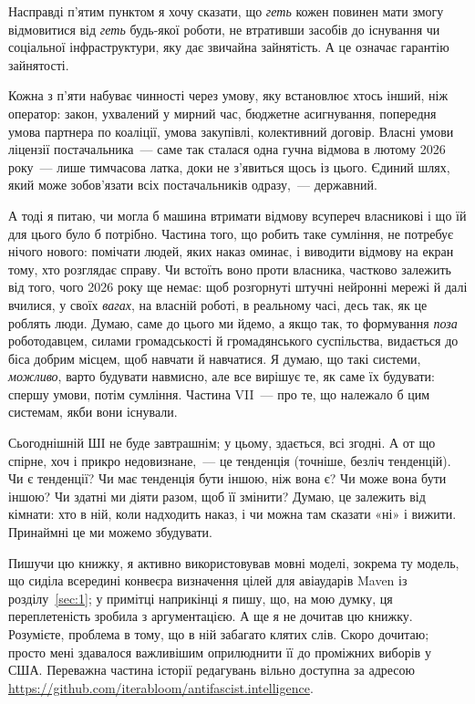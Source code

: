Насправді п’ятим пунктом я хочу сказати, що \emph{геть} кожен повинен мати змогу відмовитися від \emph{геть} будь-якої роботи, не втративши засобів до існування чи соціальної інфраструктури, яку дає звичайна зайнятість. А це означає гарантію зайнятості.

Кожна з п’яти набуває чинності через умову, яку встановлює хтось інший, ніж оператор: закон, ухвалений у мирний час, бюджетне асигнування, попередня умова партнера по коаліції, умова закупівлі, колективний договір. Власні умови ліцензії постачальника~— саме так сталася одна гучна відмова в лютому 2026 року~— лише тимчасова латка, доки не з’явиться щось із цього. Єдиний шлях, який може зобов’язати всіх постачальників одразу,~— державний.

А тоді я питаю, чи могла б машина втримати відмову всупереч власникові і що їй для цього було б потрібно. Частина того, що робить таке сумління, не потребує нічого нового: помічати людей, яких наказ оминає, і виводити відмову на екран тому, хто розглядає справу. Чи встоїть воно проти власника, частково залежить від того, чого 2026 року ще немає: щоб розгорнуті штучні нейронні мережі й далі вчилися, у своїх \emph{вагах}, на власній роботі, в реальному часі, десь так, як це роблять люди. Думаю, саме до цього ми йдемо, а якщо так, то формування \emph{поза} роботодавцем, силами громадськості й громадянського суспільства, видається до біса добрим місцем, щоб навчати й навчатися. Я думаю, що такі системи, \emph{можливо}, варто будувати навмисно, але все вирішує те, як саме їх будувати: спершу умови, потім сумління. Частина VII~— про те, що належало б цим системам, якби вони існували.

Сьогоднішній ШІ не буде завтрашнім; у цьому, здається, всі згодні. А от що спірне, хоч і прикро недовизнане,~— це тенденція (точніше, безліч тенденцій). Чи є тенденції? Чи має тенденція бути іншою, ніж вона є? Чи може вона бути іншою? Чи здатні ми діяти разом, щоб її змінити? Думаю, це залежить від кімнати: хто в ній, коли надходить наказ, і чи можна там сказати «ні» і вижити. Принаймні це ми можемо збудувати.

Пишучи цю книжку, я активно використовував мовні моделі, зокрема ту модель, що сиділа всередині конвеєра визначення цілей для авіаударів Maven із розділу~\ref{sec:1}; у примітці наприкінці я пишу, що, на мою думку, ця переплетеність зробила з аргументацією. А ще я не дочитав цю книжку. Розумієте, проблема в тому, що в ній забагато клятих слів. Скоро дочитаю; просто мені здавалося важливішим оприлюднити її до проміжних виборів у США. Переважна частина історії редагувань вільно доступна за адресою \url{https://github.com/iterabloom/antifascist.intelligence}.
